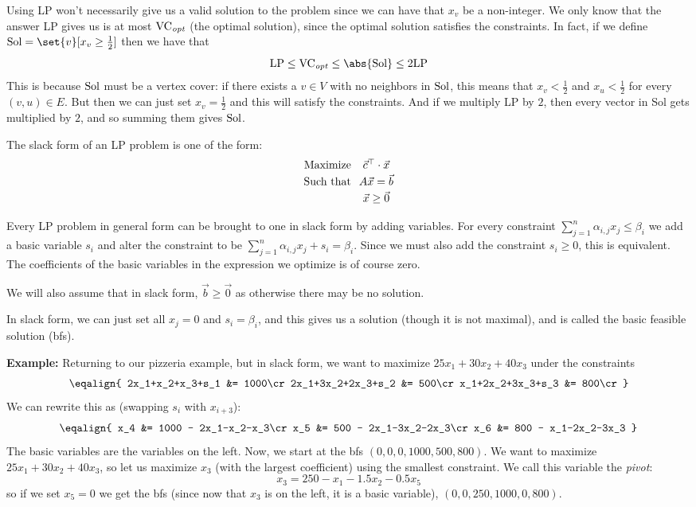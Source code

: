 Using LP won't necessarily give us a valid solution to the problem since we can have that $x_v$ be a non-integer.
We only know that the answer LP gives us is at most ${\rm VC}_{\it opt}$ (the optimal solution), since the optimal solution satisfies the constraints.
In fact, if we define ${\rm Sol}=\set{v}[x_v\geq\frac12]$ then we have that
$$ {\rm LP} \leq {\rm VC}_{\it opt} \leq \abs{\rm Sol} \leq 2{\rm LP} $$
This is because ${\rm Sol}$ must be a vertex cover: if there exists a $v\in V$ with no neighbors in ${\rm Sol}$, this means that $x_v<\frac12$ and $x_u<\frac12$ for every $(v,u)\in E$.
But then we can just set $x_v=\frac12$ and this will satisfy the constraints.
And if we multiply LP by $2$, then every vector in Sol gets multiplied by $2$, and so summing them gives ${\rm Sol}$.
\qqed

\bdefn

    The {\emphcolor slack form} of an LP problem is one of the form:
    $$ \vbox{\tabskip=.25cm\openup1\jot\halign{\hfil#&\hfil#\hfil\cr
    Maximize&$\vec c^\top\cdot\vec x$\cr
    Such that&$A\vec x=\vec b$\cr
    &$\vec x\geq\vec 0$\cr}} $$

\edefn

Every LP problem in general form can be brought to one in slack form by adding variables.
For every constraint $\sum_{j=1}^n\alpha_{i,j}x_j\leq\beta_i$ we add a basic variable $s_i$ and alter the constraint to be $\sum_{j=1}^n\alpha_{i,j}x_j+s_i=\beta_i$.
Since we must also add the constraint $s_i\geq0$, this is equivalent.
The coefficients of the basic variables in the expression we optimize is of course zero.

We will also assume that in slack form, $\vec b\geq\vec 0$ as otherwise there may be no solution.

In slack form, we can just set all $x_j=0$ and $s_i=\beta_i$, and this gives us a solution (though it is not maximal), and is called the basic feasible solution (bfs).

{\bf Example:} Returning to our pizzeria example, but in slack form, we want to maximize $25x_1+30x_2+40x_3$ under the constraints
$$ \eqalign{
    2x_1+x_2+x_3+s_1 &= 1000\cr
    2x_1+3x_2+2x_3+s_2 &= 500\cr
    x_1+2x_2+3x_3+s_3 &= 800\cr
} $$
We can rewrite this as (swapping $s_i$ with $x_{i+3}$):
$$ \eqalign{
    x_4 &= 1000 - 2x_1-x_2-x_3\cr
    x_5 &= 500 - 2x_1-3x_2-2x_3\cr
    x_6 &= 800 - x_1-2x_2-3x_3
} $$
The basic variables are the variables on the left.
Now, we start at the bfs $(0,0,0,1000,500,800)$.
We want to maximize $25x_1+30x_2+40x_3$, so let us maximize $x_3$ (with the largest coefficient) using the smallest constraint.
We call this variable the {\it pivot}:
$$ x_3 = 250 - x_1 - 1.5x_2 - 0.5x_5 $$
so if we set $x_5=0$ we get the bfs (since now that $x_3$ is on the left, it is a basic variable), $(0,0,250,1000,0,800)$.

